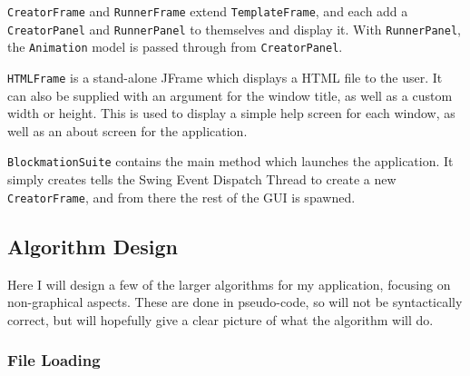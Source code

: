 \documentclass[a4paper, 11pt]{article}
\begin{document}
\texttt{CreatorFrame} and \texttt{RunnerFrame} extend \texttt{TemplateFrame}, and each add a \texttt{CreatorPanel} and \texttt{RunnerPanel} to themselves and display it. With \texttt{RunnerPanel}, the \texttt{Animation} model is passed through from \texttt{CreatorPanel}.

\texttt{HTMLFrame} is a stand-alone JFrame which displays a HTML file to the user. It can also be supplied with an argument for the window title, as well as a custom width or height. This is used to display a simple help screen for each window, as well as an about screen for the application.

\texttt{BlockmationSuite} contains the main method which launches the application. It simply creates tells the Swing Event Dispatch Thread to create a new \texttt{CreatorFrame}, and from there the rest of the GUI is spawned.

\subsection{Algorithm Design}

Here I will design a few of the larger algorithms for my application, focusing on non-graphical aspects. These are done in pseudo-code, so will not be syntactically correct, but will hopefully give a clear picture of what the algorithm will do.

\subsubsection{File Loading}
\end{document}
